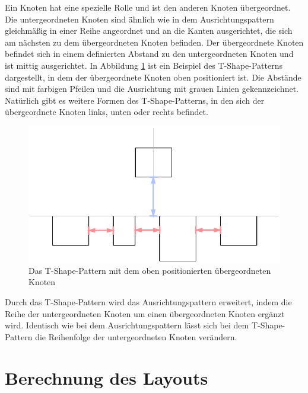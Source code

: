 Ein Knoten hat eine spezielle Rolle und ist den anderen Knoten übergeordnet. Die untergeordneten Knoten sind ähnlich wie in dem Ausrichtungspattern gleichmäßig in einer Reihe angeordnet und an die Kanten ausgerichtet, die sich am nächsten zu dem übergeordneten Knoten befinden. Der übergeordnete Knoten befindet sich in einem definierten Abstand zu den untergeordneten Knoten und ist mittig ausgerichtet. In Abbildung \ref{fig:layout-pattern-t-shape} ist ein Beispiel des T-Shape-Patterns dargestellt, in dem der übergeordnete Knoten oben positioniert ist. Die Abstände sind mit farbigen Pfeilen und die Ausrichtung mit grauen Linien gekennzeichnet. Natürlich gibt es weitere Formen des T-Shape-Patterns, in den sich der übergeordnete Knoten links, unten oder rechts befindet.

\begin{figure}[hbt]
    \centering
    \includegraphics{resources/layout-pattern-t-shape}
    \caption{Das T-Shape-Pattern mit dem oben positionierten übergeordneten Knoten}
    \label{fig:layout-pattern-t-shape}
\end{figure}

Durch das T-Shape-Pattern wird das Ausrichtungspattern erweitert, indem die Reihe der untergeordneten Knoten um einen übergeordneten Knoten ergänzt wird. Identisch wie bei dem Ausrichtungspattern lässt sich bei dem T-Shape-Pattern die Reihenfolge der untergeordneten Knoten verändern.


\section{Berechnung des Layouts}
\label{sec:layout-calculation}


